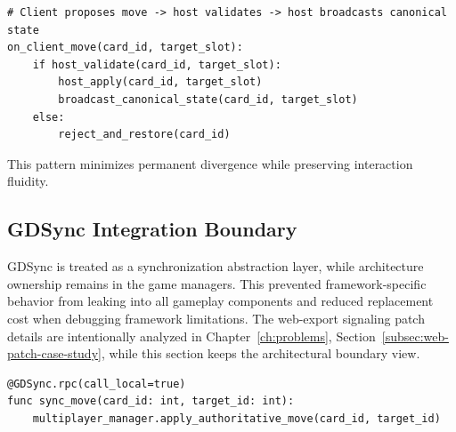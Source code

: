 \begin{lstlisting}[style={gdscript}, caption={Architectural pattern: host-authoritative move confirmation (pseudocode)}]
# Client proposes move -> host validates -> host broadcasts canonical state
on_client_move(card_id, target_slot):
    if host_validate(card_id, target_slot):
        host_apply(card_id, target_slot)
        broadcast_canonical_state(card_id, target_slot)
    else:
        reject_and_restore(card_id)
\end{lstlisting}

This pattern minimizes permanent divergence while preserving interaction fluidity.

\subsection{GDSync Integration Boundary}
\label{subsec:gdsync-integration}

GDSync is treated as a synchronization abstraction layer, while architecture ownership remains in the game managers. This prevented framework-specific behavior from leaking into all gameplay components and reduced replacement cost when debugging framework limitations.
The web-export signaling patch details are intentionally analyzed in Chapter~\ref{ch:problems}, Section~\ref{subsec:web-patch-case-study}, while this section keeps the architectural boundary view.

\begin{lstlisting}[style={gdscript}, caption={Architectural boundary: sync wrapper delegates to game manager (pseudocode)}]
@GDSync.rpc(call_local=true)
func sync_move(card_id: int, target_id: int):
    multiplayer_manager.apply_authoritative_move(card_id, target_id)
\end{lstlisting}

